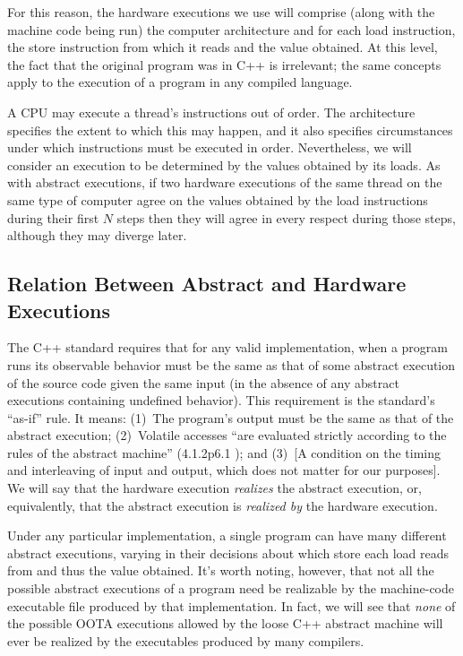 For this reason, the hardware executions we use will comprise (along
with the machine code being run) the computer architecture and for each
load instruction, the store instruction from which it reads and the
value obtained.
At this level, the fact that the original program was in C++ is
irrelevant; the same concepts apply to the execution of a program in
any compiled language.

A CPU may execute a thread's instructions out of order.
The architecture specifies the extent to which this may happen, and it
also specifies circumstances under which instructions
must be executed in order.
Nevertheless, we will consider an execution to be determined by the
values obtained by its loads.
As with abstract executions, if two hardware executions of the same
thread on the same type of computer agree on the values obtained by
the load instructions during their first $N$ steps then they will
agree in every respect during those steps, although they may diverge
later.

\subsection{Relation Between Abstract and Hardware Executions}
\label{sec:Relation Between Abstract and Hardware Executions}

The C++ standard requires that for any valid implementation, when a
program runs its observable behavior must be the same as that of some
abstract execution of the source code given the same input (in the
absence of any abstract executions containing undefined behavior).
This requirement is the standard's ``as-if'' rule.
It means:
(1)~The program's output must be the same as that of the abstract execution;
(2)~Volatile accesses ``are evaluated strictly according to the
rules of the abstract machine'' (4.1.2p6.1 ); and
(3)~[A condition on the timing and interleaving of input and output,
which does not matter for our purposes].
We will say that the hardware execution \emph{realizes} the abstract execution,
or, equivalently, that the abstract execution is \emph{realized by}
the hardware execution.

Under any particular implementation,
a single program can have many different abstract executions,
varying in their decisions about which store each load reads from
and thus the value obtained.
It's worth noting, however, that not all the possible abstract executions
of a program need be realizable by the machine-code executable file
produced by that implementation.
In fact, we will see that \emph{none} of the possible OOTA executions
allowed by the loose C++ abstract machine will ever be realized
by the executables produced by many compilers.

